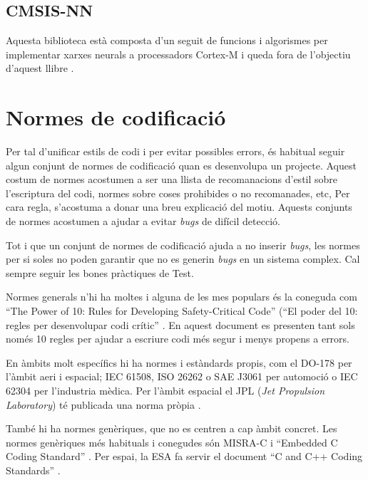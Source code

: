 \section{CMSIS-NN}
\label{sec:CMSIS-NN}
Aquesta biblioteca està composta d'un seguit de funcions i algorismes per implementar xarxes neurals a processadors Cortex-M i queda fora de l'objectiu d'aquest llibre \cite{CMSIS_NN_paper}\cite{CMSIS-NN}.

\chapter{Normes de codificació}
\label{sec:GuiesProgramacio}

Per tal d'unificar estils de codi i per evitar possibles errors, és habitual seguir algun conjunt de normes de codificació quan es desenvolupa un projecte. Aquest costum de normes acostumen a ser una llista de recomanacions d'estil sobre l'escriptura del codi, normes sobre coses prohibides o no recomanades, etc, Per cara regla, s'acostuma a donar una breu explicació del motiu. Aquests conjunts de normes acostumen a ajudar a evitar {\em bugs} de difícil detecció.

\begin{remark}
Tot i que un conjunt de normes de codificació ajuda a no inserir {\em bugs}, les normes per si soles no poden garantir que no es generin {\em bugs} en un sistema complex. Cal sempre seguir les bones pràctiques de Test.%
\end{remark}

Normes generals n'hi ha moltes i alguna de les mes populars és la coneguda com ``The Power of 10: Rules for Developing Safety-Critical Code'' (``El poder del 10: regles per desenvolupar codi crític'' \cite{powerof10}. En aquest document es presenten tant sols només 10 regles per ajudar a escriure codi més segur i menys propens a errors. 

En àmbits molt específics hi ha normes i estàndards propis, com el DO-178 per l'àmbit aeri i espacial; IEC 61508, ISO 26262 o SAE J3061 per automoció o IEC 62304 per l'industria mèdica. Per l'àmbit espacial el JPL ({\em Jet Propulsion Laboratory}) té publicada una norma pròpia \cite{JPLCProgramming}.

També hi ha normes genèriques, que no es centren a cap àmbit concret. Les normes genèriques més habituals i conegudes són MISRA-C \cite{MISRAHomepage} i ``Embedded C Coding Standard'' \cite{BARRGuidelines}. Per espai, la \gls{ESA} fa servir el document  ``C and C++ Coding Standards'' \cite{BSSC}.

